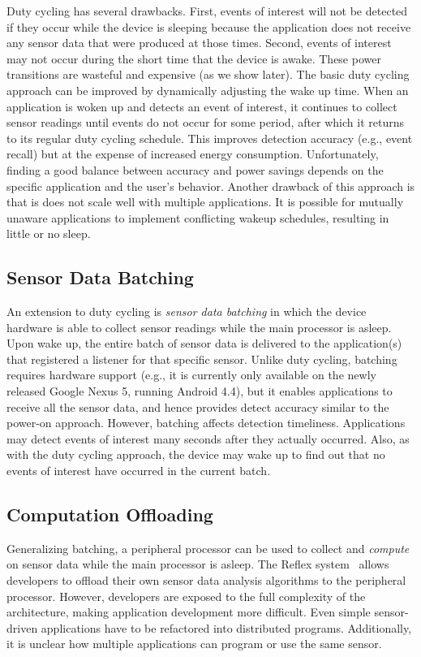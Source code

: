 Duty cycling has several drawbacks. First, events of interest will not be
detected if they occur while the device is sleeping because the application does
not receive any sensor data that were produced at those times. Second, events of
interest may not occur during the short time that the device is awake. These
power transitions are wasteful and expensive (as we show later). The basic duty
cycling approach can be improved by dynamically adjusting the wake up time. When
an application is woken up and detects an event of interest, it continues to
collect sensor readings until events do not occur for some period, after which
it returns to its regular duty cycling schedule. This improves detection
accuracy (e.g., event recall) but at the expense of increased energy
consumption. Unfortunately, finding a good balance between accuracy and power
savings depends on the specific application and the user's behavior. Another
drawback of this approach is that is does not scale well with multiple
applications. It is possible for mutually unaware applications to implement
conflicting wakeup schedules, resulting in little or no sleep.

\subsection{Sensor Data Batching}

An extension to duty cycling is \emph{sensor data batching} in which the device
hardware is able to collect sensor readings while the main processor is
asleep. Upon wake up, the entire batch of sensor data is delivered to the
application(s) that registered a listener for that specific sensor. Unlike duty
cycling, batching requires hardware support (e.g., it is currently only
available on the newly released Google Nexus 5, running Android 4.4), but it
enables applications to receive all the sensor data, and hence provides detect
accuracy similar to the power-on approach. However, batching affects detection
timeliness. Applications may detect events of interest many seconds after they
actually occurred. Also, as with the duty cycling approach, the device may wake
up to find out that no events of interest have occurred in the current batch.

\subsection{Computation Offloading}

Generalizing batching, a peripheral processor can be used to collect and
\emph{compute} on sensor data while the main processor is asleep. The Reflex
system~\cite{reflex} allows developers to offload their own sensor data analysis
algorithms to the peripheral processor. However, developers are exposed to the
full complexity of the architecture, making application development more
difficult. Even simple sensor-driven applications have to be refactored into
distributed programs. Additionally, it is unclear how multiple applications can
program or use the same sensor.

